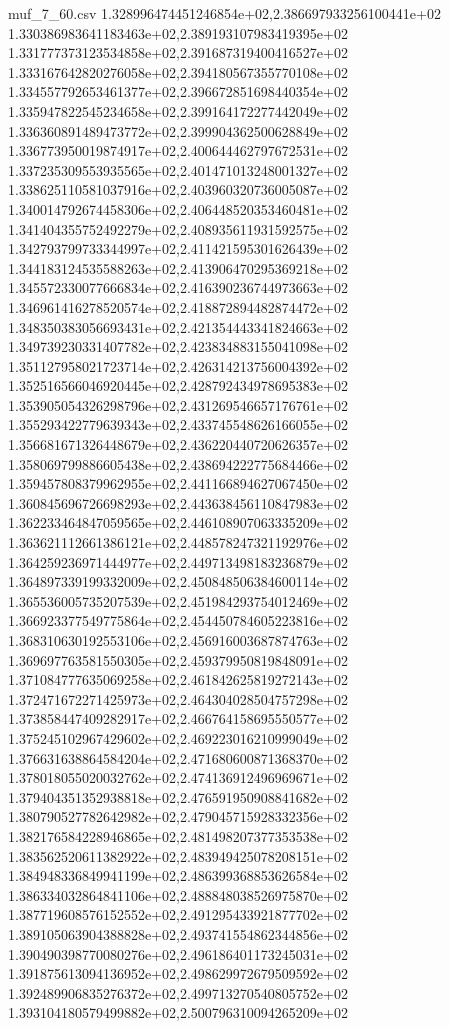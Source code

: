 \begin{filecontents*}{muf_7_60.csv}
1.328996474451246854e+02,2.386697933256100441e+02
1.330386983641183463e+02,2.389193107983419395e+02
1.331777373123534858e+02,2.391687319400416527e+02
1.333167642820276058e+02,2.394180567355770108e+02
1.334557792653461377e+02,2.396672851698440354e+02
1.335947822545234658e+02,2.399164172277442049e+02
1.336360891489473772e+02,2.399904362500628849e+02
1.336773950019874917e+02,2.400644462797672531e+02
1.337235309553935565e+02,2.401471013248001327e+02
1.338625110581037916e+02,2.403960320736005087e+02
1.340014792674458306e+02,2.406448520353460481e+02
1.341404355752492279e+02,2.408935611931592575e+02
1.342793799733344997e+02,2.411421595301626439e+02
1.344183124535588263e+02,2.413906470295369218e+02
1.345572330077666834e+02,2.416390236744973663e+02
1.346961416278520574e+02,2.418872894482874472e+02
1.348350383056693431e+02,2.421354443341824663e+02
1.349739230331407782e+02,2.423834883155041098e+02
1.351127958021723714e+02,2.426314213756004392e+02
1.352516566046920445e+02,2.428792434978695383e+02
1.353905054326298796e+02,2.431269546657176761e+02
1.355293422779639343e+02,2.433745548626166055e+02
1.356681671326448679e+02,2.436220440720626357e+02
1.358069799886605438e+02,2.438694222775684466e+02
1.359457808379962955e+02,2.441166894627067450e+02
1.360845696726698293e+02,2.443638456110847983e+02
1.362233464847059565e+02,2.446108907063335209e+02
1.363621112661386121e+02,2.448578247321192976e+02
1.364259236971444977e+02,2.449713498183236879e+02
1.364897339199332009e+02,2.450848506384600114e+02
1.365536005735207539e+02,2.451984293754012469e+02
1.366923377549775864e+02,2.454450784605223816e+02
1.368310630192553106e+02,2.456916003687874763e+02
1.369697763581550305e+02,2.459379950819848091e+02
1.371084777635069258e+02,2.461842625819272143e+02
1.372471672271425973e+02,2.464304028504757298e+02
1.373858447409282917e+02,2.466764158695550577e+02
1.375245102967429602e+02,2.469223016210999049e+02
1.376631638864584204e+02,2.471680600871368370e+02
1.378018055020032762e+02,2.474136912496969671e+02
1.379404351352938818e+02,2.476591950908841682e+02
1.380790527782642982e+02,2.479045715928332356e+02
1.382176584228946865e+02,2.481498207377353538e+02
1.383562520611382922e+02,2.483949425078208151e+02
1.384948336849941199e+02,2.486399368853626584e+02
1.386334032864841106e+02,2.488848038526975870e+02
1.387719608576152552e+02,2.491295433921877702e+02
1.389105063904388828e+02,2.493741554862344856e+02
1.390490398770080276e+02,2.496186401173245031e+02
1.391875613094136952e+02,2.498629972679509592e+02
1.392489906835276372e+02,2.499713270540805752e+02
1.393104180579499882e+02,2.500796310094265209e+02

\end{filecontents*}
